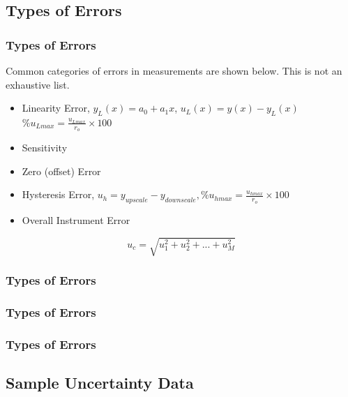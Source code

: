\documentclass[fleqn]{beamer} %
\newcommand{\sectionIIsubsectionIIItitle}{Types of Errors}
\newcommand{\sectionIIsubsectionIVtitle}{Sample Uncertainty Data}
\begin{document}
		\subsection{\sectionIIsubsectionIIItitle}\label{sectionIIsubsectionIII}

			\begin{frame}
				\frametitle{\sectionIIsubsectionIIItitle}

				Common categories of errors in measurements are shown below. This is not an exhaustive list.  

				\begin{itemize}
					
					\item Linearity Error, $y_L(x)=a_0+a_1x$, $u_L(x)=y(x)-y_L(x)$ \vspc $\% u_{L max}=\frac{u_{L max}}{r_o}\times 100$
					\item Sensitivity \vspc
					\item Zero (offset) Error \vspc
					\item Hysteresis Error, $u_h=y_{upscale}-y_{downscale}, \%u_{h max}=\frac{u_{h max}}{r_o}\times 100$\vspc
					\item Overall Instrument Error \vspc
				
        \end{itemize}

				\[u_c=\sqrt{u_1^2+u_2^2+...+u_M^2}\]

			\end{frame}		

			\begin{frame}
				\frametitle{\sectionIIsubsectionIIItitle}

				

			\end{frame}

			\begin{frame}
				\frametitle{\sectionIIsubsectionIIItitle}

			\end{frame}

			\begin{frame}
			\frametitle{\sectionIIsubsectionIIItitle}





			\end{frame}

		\subsection{\sectionIIsubsectionIVtitle}\label{sectionIIsubsectionIV}
\end{document}
